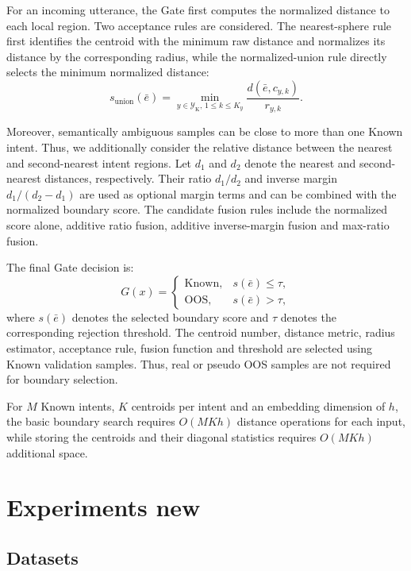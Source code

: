 \documentclass[11pt]{article}
\begin{document}
For an incoming utterance, the Gate first computes the normalized distance to each local region. Two acceptance rules are considered. The nearest-sphere rule first identifies the centroid with the minimum raw distance and normalizes its distance by the corresponding radius, while the normalized-union rule directly selects the minimum normalized distance:
\begin{equation}
s_{\mathrm{union}}(\bar{e})=\min_{y\in\mathcal{Y}_{\mathrm{K}},\,1\leq k\leq K_y}\frac{d(\bar{e},c_{y,k})}{r_{y,k}}.
\label{eq:ryk}
\end{equation}

Moreover, semantically ambiguous samples can be close to more than one Known intent. Thus, we additionally consider the relative distance between the nearest and second-nearest intent regions. Let $d_1$ and $d_2$ denote the nearest and second-nearest distances, respectively. Their ratio $d_1/d_2$ and inverse margin $d_1/(d_2-d_1)$ are used as optional margin terms and can be combined with the normalized boundary score. The candidate fusion rules include the normalized score alone, additive ratio fusion, additive inverse-margin fusion and max-ratio fusion.

The final Gate decision is:
\begin{equation}
G(x)=
\begin{cases}
\mathrm{Known}, & s(\bar{e})\leq\tau,\\
\mathrm{OOS}, & s(\bar{e})>\tau,
\end{cases}
\end{equation}
where $s(\bar{e})$ denotes the selected boundary score and $\tau$ denotes the corresponding rejection threshold. The centroid number, distance metric, radius estimator, acceptance rule, fusion function and threshold are selected using Known validation samples. Thus, real or pseudo OOS samples are not required for boundary selection.

For $M$ Known intents, $K$ centroids per intent and an embedding dimension of $h$, the basic boundary search requires $O(MKh)$ distance operations for each input, while storing the centroids and their diagonal statistics requires $O(MKh)$ additional space.


\section{Experiments new}
\subsection{Datasets}
\end{document}
